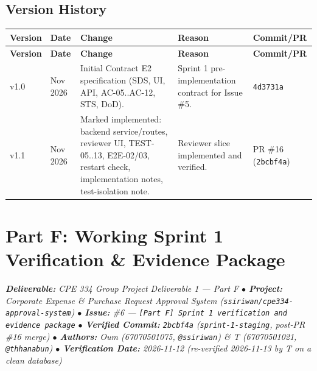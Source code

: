 \documentclass[11pt,a4paper]{article}
\begin{document}
\subsection{Version History}

\vspace{0.3em}
\begin{longtable}{|>{\centering\arraybackslash}p{1.2cm}|>{\centering\arraybackslash}p{1.8cm}|>{\RaggedRight}p{6.6cm}|>{\RaggedRight}p{3.2cm}|>{\centering\arraybackslash}p{1.6cm}|}
\hline
\rowcolor{zenPale}\textbf{Version} & \textbf{Date} & \textbf{Change} & \textbf{Reason} & \textbf{Commit/PR} \\ \hline
\endfirsthead
\hline
\rowcolor{zenPale}\textbf{Version} & \textbf{Date} & \textbf{Change} & \textbf{Reason} & \textbf{Commit/PR} \\ \hline
\endhead
\hline
\endfoot
v1.0 & 12 Nov 2026 & Initial Contract E2 specification (SDS, UI, API, AC-05..AC-12, STS, DoD). & Sprint 1 pre-implementation contract for Issue \#5. & \texttt{4d3731a} \\ \hline
v1.1 & 12 Nov 2026 & Marked implemented: backend service/\allowbreak{}routes, reviewer UI, TEST-05..13, E2E-02/03, restart check, implementation notes, test-isolation\allowbreak{} note. & Reviewer slice implemented and verified. & PR \#16 (\texttt{2bcbf4a}) \\ \hline
\end{longtable}
\vspace{0.3em}
\newpage
\section{Part F: Working Sprint 1 Verification & Evidence Package}\label{sec:part-f}

\begin{tcolorbox}[colback=lightbg,colframe=secondary,arc=2mm,boxrule=0.8pt]\small\itshape
\textbf{Deliverable:} CPE 334 Group Project Deliverable 1 — Part F \quad $\bullet$ \quad \textbf{Project:} Corporate Expense \& Purchase Request Approval System (\texttt{ssiriwan/cpe334-approval-system}) \quad $\bullet$ \quad \textbf{Issue:} \#6 — \texttt{[Part F] Sprint 1 verification and evidence package} \quad $\bullet$ \quad \textbf{Verified Commit:} \texttt{2bcbf4a} (\texttt{sprint-1-staging}, post-PR \#16 merge) \quad $\bullet$ \quad \textbf{Authors:} Oum (67070501075, \texttt{@ssiriwan}) \& T (67070501021, \texttt{@thhanabun}) \quad $\bullet$ \quad \textbf{Verification Date:} 2026-11-12 (re-verified 2026-11-13 by T on a clean database)
\end{tcolorbox}
\end{document}
